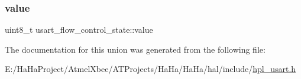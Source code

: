 \mbox{\label{unionusart__flow__control__state_a89fd17179ea28972111f4e5822de3e4e}} 
\subsubsection{\texorpdfstring{value}{value}}
{\footnotesize\ttfamily uint8\+\_\+t usart\+\_\+flow\+\_\+control\+\_\+state\+::value}



The documentation for this union was generated from the following file\+:\begin{DoxyCompactItemize}
\item 
E\+:/\+Ha\+Ha\+Project/\+Atmel\+Xbee/\+A\+T\+Projects/\+Ha\+Ha/\+Ha\+Ha/hal/include/\hyperlink{hpl__usart_8h}{hpl\+\_\+usart.\+h}\end{DoxyCompactItemize}
